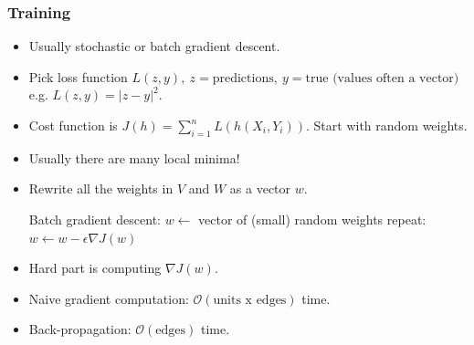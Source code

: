 \documentclass[10pt]{article}
\newcommand{\bigo}{\mathcal{O}}
\begin{document}
\subsubsection*{Training}
\begin{itemize}
	\item Usually stochastic or batch gradient descent.
	\item Pick loss function $L(z, y), \ z=\text{predictions}, \ y=\text{true (values often a vector)}$ e.g. $L(z, y) = |z - y|^{2}$.
	\item Cost function is $J(h) = \sum_{i=1}^{n} L(h(X_{i}, Y_{i}))$. Start with random weights.
	\item Usually there are many local minima!
	\item Rewrite all the weights in $V$ and $W$ as a vector $w$.
\begin{codeblock}
    Batch gradient descent:
	    $w \leftarrow$ vector of (small) random weights
	    repeat:
	        $w \leftarrow w - \epsilon \nabla J(w)$
\end{codeblock}
	\item Hard part is computing $\nabla J(w)$.
	\item Naive gradient computation: $\bigo (\text{units x edges})$ time.
	\item Back-propagation: $\bigo (\text{edges})$ time.
\end{itemize}
\end{document}
